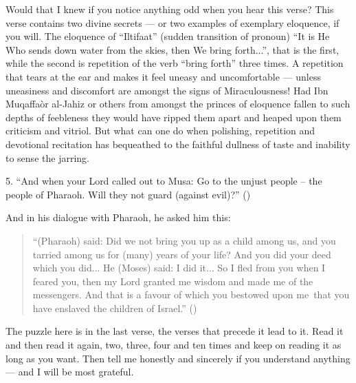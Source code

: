 \documentclass[12pt]{memoir}
\begin{document}
Would that I knew if you notice anything odd when you hear this verse?
This verse contains two divine secrets —
or two examples of exemplary eloquence, if you will.
The eloquence of “Iltifaat” (sudden transition of pronoun)
“It is He Who sends down water from the skies, then We bring forth...”,
that is the first, while the second is repetition
of the verb “bring forth” three times.
A repetition that tears at the ear and makes it feel uneasy and uncomfortable —
unless uneasiness and discomfort are amongst the signs of Miraculousness!
Had Ibn Muqaffa\` or al-Jahiz or others from amongst the princes of eloquence
fallen to such depths of feebleness they would have ripped them apart
and heaped upon them criticism and vitriol.
But what can one do when polishing,
repetition and devotional recitation has bequeathed
to the faithful dullness of taste and inability to sense the jarring.

5. “And when your Lord called out to Musa:
Go to the unjust people – the people of Pharaoh.
Will they not guard (against evil)?” ()

And in his dialogue with Pharaoh, he asked him this:

\begin{quote}
“(Pharaoh) said: Did we not bring you up as a child among us,
and you tarried among us for (many) years of your life?
And you did your deed which you did...
He (Moses) said: I did it...
So I fled from you when I feared you,
then my Lord granted me wisdom and made me of the messengers.
And that is a favour of which you bestowed upon me\fnmarksym[*]\
that you have enslaved the children of Israel.” ()
\end{quote}

\renewcommand{\thefootnote}{*}


The puzzle here is in the last verse, the verses that precede it lead to it.
Read it and then read it again, two, three,
four and ten times and keep on reading it as long as you want.
Then tell me honestly and sincerely if you understand anything —
and I will be most grateful.
\end{document}
